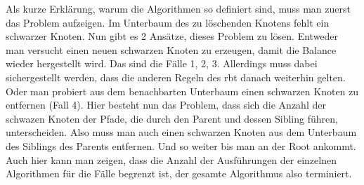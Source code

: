 \documentclass[11pt]{article}
\begin{document}
Als kurze Erklärung, warum die Algorithmen so definiert sind, muss man zuerst das Problem aufzeigen. Im Unterbaum des zu löschenden Knotens fehlt ein schwarzer Knoten. Nun gibt es 2 Ansätze, dieses Problem zu lösen. Entweder man versucht
einen neuen schwarzen Knoten zu erzeugen, damit die Balance wieder hergestellt wird. Das sind die Fälle 1, 2, 3. Allerdings muss dabei sichergestellt werden, dass die anderen Regeln des \gls{rbt} danach weiterhin gelten. Oder man probiert aus dem benachbarten Unterbaum einen schwarzen Knoten zu entfernen (Fall 4).
Hier besteht nun das Problem, dass sich die Anzahl der schwazen Knoten der Pfade, die durch den Parent und dessen Sibling führen, unterscheiden. Also muss man auch einen schwarzen Knoten aus dem Unterbaum des Siblings des Parents entfernen. Und so weiter bis man an der Root ankommt.  
Auch hier kann man zeigen, dass die Anzahl der Ausführungen der einzelnen Algorithmen für die Fälle begrenzt ist, der gesamte Algorithmus also terminiert.
\end{document}
